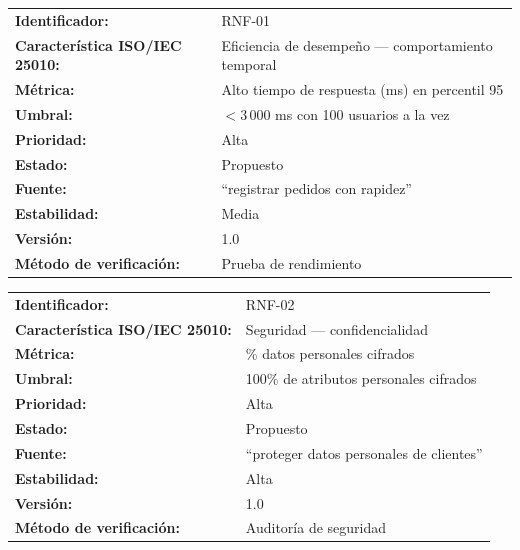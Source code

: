 \documentclass{article}
\begin{document}
\medskip

\begin{tcolorbox}[colback=white, colframe=black, boxrule=0.5pt, sharp corners, 
  title={}, breakable]

\medskip
\begin{tabularx}{\linewidth}{@{}l X@{}}
\textbf{Identificador:}                    & RNF-01 \\
\textbf{Característica ISO/IEC 25010:}     & Eficiencia de desempeño — comportamiento temporal \\
\textbf{Métrica:}                          & Alto tiempo de respuesta (ms) en percentil 95 \\
\textbf{Umbral:}                           & $< 3\,000$ ms con 100 usuarios a la vez \\
\textbf{Prioridad:}                        & Alta \\
\textbf{Estado:}                           & Propuesto \\
\textbf{Fuente:}                           & ``registrar pedidos con rapidez'' \\
\textbf{Estabilidad:}                      & Media \\
\textbf{Versión:}                          & 1.0 \\
\textbf{Método de verificación:}           & Prueba de rendimiento \\
\end{tabularx}
\end{tcolorbox}

\begin{tcolorbox}[colback=white, colframe=black, boxrule=0.5pt, sharp corners, 
  title={}, breakable]

\medskip
\begin{tabular}{@{}ll@{}}
\textbf{Identificador:}                    & RNF-02 \\
\textbf{Característica ISO/IEC 25010:}     & Seguridad — confidencialidad \\
\textbf{Métrica:}                          & \% datos personales cifrados \\
\textbf{Umbral:}                           & 100\% de atributos personales cifrados \\
\textbf{Prioridad:}                        & Alta \\
\textbf{Estado:}                           & Propuesto \\
\textbf{Fuente:}                           & ``proteger datos personales de clientes'' \\
\textbf{Estabilidad:}                      & Alta \\
\textbf{Versión:}                          & 1.0 \\
\textbf{Método de verificación:}           & Auditoría de seguridad \\
\end{tabular}
\end{tcolorbox}
\end{document}
